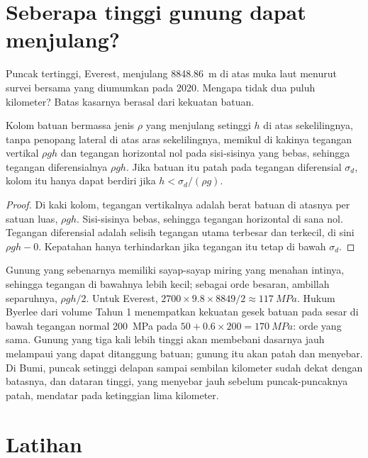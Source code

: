 \section{Seberapa tinggi gunung dapat menjulang?}\label{sec:b2:himalaya-andes:heights}

Puncak tertinggi, Everest, menjulang \qty{8848.86}{m} di atas muka laut menurut survei bersama
yang diumumkan pada 2020. Mengapa tidak dua puluh kilometer? Batas kasarnya berasal dari kekuatan batuan.

\begin{proposition}\label{prop:b2:himalaya-andes:height}
Kolom batuan bermassa jenis $\rho$ yang menjulang setinggi $h$ di atas sekelilingnya, tanpa penopang
lateral di atas aras sekelilingnya, memikul di kakinya tegangan vertikal $\rho g h$ dan
tegangan horizontal nol pada sisi-sisinya yang bebas, sehingga tegangan diferensialnya $\rho g h$. Jika
batuan itu patah pada tegangan diferensial $\sigma_d$, kolom itu hanya dapat berdiri jika $h < \sigma_d/(\rho
g)$.
\end{proposition}

\begin{proof}
Di kaki kolom, tegangan vertikalnya adalah berat batuan di atasnya per satuan luas,
$\rho g h$. Sisi-sisinya bebas, sehingga tegangan horizontal di sana nol. Tegangan
diferensial adalah selisih tegangan utama terbesar dan terkecil, di sini $\rho g h - 0$.
Kepatahan hanya terhindarkan jika tegangan itu tetap di bawah $\sigma_d$.
\end{proof}

Gunung yang sebenarnya memiliki sayap-sayap miring yang menahan intinya, sehingga tegangan di bawahnya
lebih kecil; sebagai orde besaran, ambillah separuhnya, $\rho g h/2$. Untuk Everest, $2700 \times 9.8
\times 8849/2 \approx \qty{117}{MPa}$. Hukum Byerlee dari volume Tahun 1 menempatkan kekuatan gesek
batuan pada sesar di bawah tegangan normal \qty{200}{MPa} pada $50 + 0.6 \times 200 =
\qty{170}{MPa}$: orde yang sama. Gunung yang tiga kali lebih tinggi akan membebani dasarnya jauh melampaui
yang dapat ditanggung batuan; gunung itu akan patah dan menyebar. Di Bumi, puncak setinggi delapan sampai sembilan kilometer
sudah dekat dengan batasnya, dan dataran tinggi, yang menyebar jauh sebelum puncak-puncaknya patah, mendatar
pada ketinggian lima kilometer.

\section*{Latihan}\label{sec:b2:himalaya-andes:exercises}

